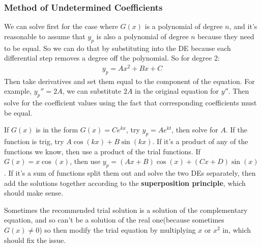 \documentclass{article}
\begin{document}
\subsubsection{Method of Undetermined Coefficients}
We can solve first for the case where $G(x)$ is a polynomial of degree $n$, and it's reasonable to assume that $y_p$ is also a polynomial of degree $n$ because they need to be equal. So we can do that by substituting into the DE because each differential step removes a degree off the polynomial.
So for degree 2:
\begin{gather*}
    y_p = Ax^2 + Bx + C
\end{gather*}
Then take derivatives and set them equal to the component of the equation. For example, $y_p'' = 2A$, we can substitute  $2A$ in the original equation for $y''$. Then solve for the coefficient values using the fact that corresponding coefficients must be equal.

If $G(x)$ is in the form $G(x) = Ce^{kx}$, try $y_p = Ae^{kt}$, then solve for $A$. If the function is trig, try $A\cos(kx) + B\sin(kx)$. If it's a product of any of the functions we know, then use a product of the trial functions. If $G(x) = x \cos(x)$, then use $y_p = (Ax+B)\cos(x) + (Cx+D)\sin(x)$. If it's a sum of functions split them out and solve the two DEs separately, then add the solutions together according to the \textbf{superposition principle}, which should make sense.

Sometimes the recommended trial solution is a solution of the complementary equation, and so can't be a solution of the real one(because sometimes $G(x) \neq 0$) so then modify the trial equation by multiplying $x$ or $x^2$ in, which should fix the issue.
\end{document}
